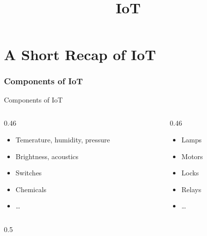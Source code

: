 ﻿\title[IoT]{\large IoT}

\def\insertlecturepartnumbername{\Huge\alert{Overview of IoT Systems}}


\part{A Short Recap of IoT}
\section{Components of IoT}

\begin{frame}{Components of IoT}
  \begin{columns}
    \begin{column}[T]{0.46\textwidth}
      \begin{description}[Microcontroller]
        \item[Sensors]
        \begin{itemize}
          \item Temerature, humidity, pressure
          \item Brightness, acoustics
          \item Switches
          \item Chemicals
          \item \ldots
        \end{itemize}
      \end{description}
    \end{column}
    \begin{column}[T]{0.46\textwidth}
      \begin{description}[Actuators]
        \item[Actuators]
        \begin{itemize}
          \item Lamps
          \item Motors
          \item Locks
          \item Relays
          \item \ldots
        \end{itemize}
      \end{description}
    \end{column}
  \end{columns}
  \vspace{0.5cm}
  \begin{columns}
    \begin{column}[T]{0.5\textwidth}

\end{column}
\end{columns}
\end{frame}
